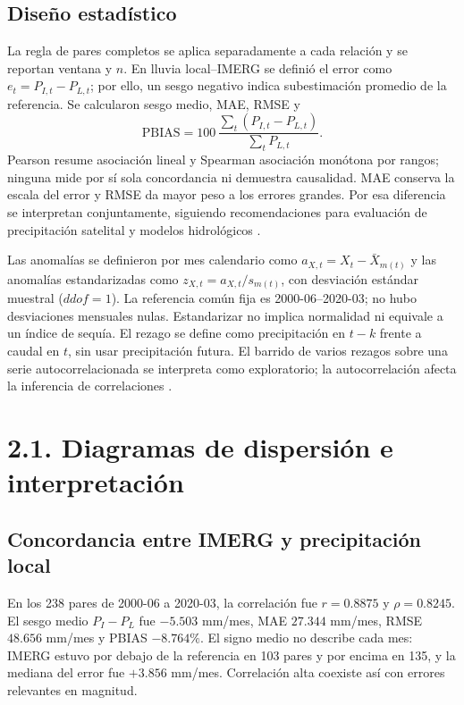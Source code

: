 \documentclass[12pt,letterpaper]{article}
\begin{document}
\subsection{Diseño estadístico}
La regla de pares completos se aplica separadamente a cada relación y se reportan ventana y $n$. En lluvia local--IMERG se definió el error como $e_t=P_{I,t}-P_{L,t}$; por ello, un sesgo negativo indica subestimación promedio de la referencia. Se calcularon sesgo medio, MAE, RMSE y
\begin{equation}
\mathrm{PBIAS}=100\,\frac{\sum_t(P_{I,t}-P_{L,t})}{\sum_t P_{L,t}}.
\end{equation}
Pearson resume asociación lineal y Spearman asociación monótona por rangos; ninguna mide por sí sola concordancia ni demuestra causalidad. MAE conserva la escala del error y RMSE da mayor peso a los errores grandes. Por esa diferencia se interpretan conjuntamente, siguiendo recomendaciones para evaluación de precipitación satelital y modelos hidrológicos \parencite{HossainHuffman2008,Gupta2009,Willmott1981}.

Las anomalías se definieron por mes calendario como $a_{X,t}=X_t-\bar X_{m(t)}$ y las anomalías estandarizadas como $z_{X,t}=a_{X,t}/s_{m(t)}$, con desviación estándar muestral ($ddof=1$). La referencia común fija es 2000-06--2020-03; no hubo desviaciones mensuales nulas. Estandarizar no implica normalidad ni equivale a un índice de sequía. El rezago se define como precipitación en $t-k$ frente a caudal en $t$, sin usar precipitación futura. El barrido de varios rezagos sobre una serie autocorrelacionada se interpreta como exploratorio; la autocorrelación afecta la inferencia de correlaciones \parencite{PyperPeterman1998}.

\section{2.1. Diagramas de dispersión e interpretación}

\subsection{Concordancia entre IMERG y precipitación local}
En los 238 pares de 2000-06 a 2020-03, la correlación fue $r=0.8875$ y $\rho=0.8245$. El sesgo medio $P_I-P_L$ fue $-5.503$ mm/mes, MAE $27.344$ mm/mes, RMSE $48.656$ mm/mes y PBIAS $-8.764\%$. El signo medio no describe cada mes: IMERG estuvo por debajo de la referencia en 103 pares y por encima en 135, y la mediana del error fue $+3.856$ mm/mes. Correlación alta coexiste así con errores relevantes en magnitud.
\end{document}
